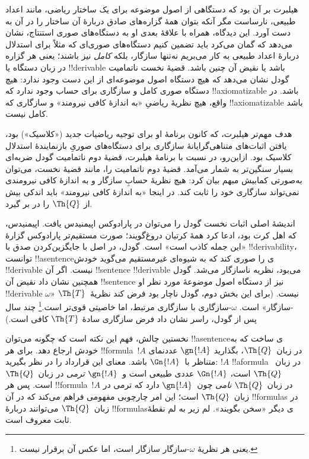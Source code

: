 \documentclass[../../../include/open-logic-section]{subfiles}
\begin{document}


هیلبرت بر آن بود که دستگاهی از اصول موضوعه برای یک ساختار ریاضی، مانند
اعداد طبیعی، نارساست مگر آنکه بتوان همهٔ گزاره‌های صادق دربارهٔ آن
ساختار را در آن به دست آورد. این دیدگاه، همراه با علاقهٔ بعدی او به
دستگاه‌های صوری استنتاج، نشان می‌دهد که گمان می‌کرد باید تضمین کنیم
دستگاه‌های صوری‌ای که مثلاً برای استدلال دربارهٔ اعداد طبیعی به کار
می‌بریم نه‌تنها سازگار، بلکه \emph{کامل} نیز باشند؛ یعنی هر گزاره در
زبان دستگاه یا !!{derivable} باشد یا نقیض آن چنین باشد. قضیهٔ نخست
ناتمامیت گودل نشان می‌دهد که هیچ دستگاه اصول موضوعه‌ای از این دست وجود
ندارد: هیچ دستگاه صوری کامل و سازگاری برای حساب وجود ندارد که
!!{axiomatizable} باشد. در واقع، هیچ نظریهٔ ریاضیِ «به اندازهٔ کافی
نیرومند» و سازگاری که !!{axiomatizable} باشد کامل نیست.

هدف مهم‌تر هیلبرت، که کانون برنامهٔ او برای توجیه ریاضیات جدید
(«کلاسیک») بود، یافتن اثبات‌های متناهی‌گرایانهٔ سازگاری برای دستگاه‌های
صوریِ بازنمایندهٔ استدلال کلاسیک بود. ازاین‌رو، در نسبت با برنامهٔ
هیلبرت، قضیهٔ دوم ناتمامیت گودل ضربه‌ای بسیار سنگین‌تر به شمار می‌آمد.
قضیهٔ دوم ناتمامیت را، مانند قضیهٔ نخست، می‌توان به‌صورتی کمابیش مبهم
بیان کرد: هیچ نظریهٔ حسابِ سازگار و به اندازهٔ کافی نیرومندی نمی‌تواند سازگاری
خود را ثابت کند. در اینجا «به اندازهٔ کافی نیرومند» باید اندکی بیش از
$\Th{Q}$ را در بر گیرد.

اندیشهٔ اصلی اثبات نخست گودل را می‌توان در پارادوکس اپیمنیدس یافت.
اپیمنیدس، که اهل کرت بود، ادعا کرد همهٔ کرتیان دروغ‌گویند؛ صورت مستقیم‌تر
پارادوکس گزارهٔ «این جمله کاذب است» است. گودل، در اصل با جایگزین‌کردن
صدق با !!{derivability}، توانست !!a{sentence}ی را صوری کند که به شیوه‌ای
غیرمستقیم می‌گوید خودش !!{derivable} نیست. اگر آن !!{sentence}
!!{derivable} می‌بود، نظریه ناسازگار می‌شد. گودل همچنین نشان داد نقیض آن
!!{sentence} نیز از دستگاه اصول موضوعهٔ مورد نظر او !!{derivable}
نیست. (برای این بخش دوم، گودل ناچار بود فرض کند نظریهٔ~$\Th{T}$
«$\omega$-سازگار» است. $\omega$-سازگاری با سازگاری مرتبط، اما خاصیتی
قوی‌تر است.\footnote{یعنی هر نظریهٔ $\omega$-سازگار سازگار است، اما عکس
آن برقرار نیست.} چند سال پس از گودل، راسر نشان داد فرض سازگاری سادهٔ
$\Th{T}$ کافی است.)

نخستین چالش، فهم این نکته است که چگونه می‌توان !!a{sentence}ی ساخت که
به خودش ارجاع دهد. برای هر !!{formula}~$!A$ در زبان~$\Th{Q}$، بگذارید
$\gn{!A}$ عددنمای متناظر با~$\Gn{!A}$ باشد. معنای این قرارداد را در
نظر بگیرید: $!A$ !!a{formula} در زبان~$\Th{Q}$ است، $\Gn{!A}$ عددی
طبیعی است و~$\gn{!A}$ \emph{ترمی} در زبان~$\Th{Q}$ است. پس هر
!!{formula}~$!A$ در زبان~$\Th{Q}$ \emph{نامی} چون~$\gn{!A}$ دارد که
ترمی در زبان~$\Th{Q}$ است؛ این امر چارچوبی مفهومی فراهم می‌کند که در آن
!!{formula}s در زبان~$\Th{Q}$ می‌توانند دربارهٔ !!{formula}sی دیگر
«سخن بگویند». لم زیر به لم نقطهٔ ثابت معروف است.
\end{document}
